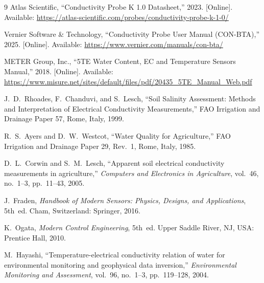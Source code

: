 \documentclass[conference]{IEEEtran}
\begin{document}
\begin{thebibliography}{9}
Atlas Scientific, ``Conductivity Probe K 1.0 Datasheet,'' 2023. [Online]. Available: \url{https://atlas-scientific.com/probes/conductivity-probe-k-1-0/}

{\raggedright
Vernier Software \& Technology, ``Conductivity Probe User Manual (CON-BTA),'' 2025. [Online]. Available: \url{https://www.vernier.com/manuals/con-bta/}\par}

METER Group, Inc., ``5TE Water Content, EC and Temperature Sensors Manual,'' 2018. [Online]. Available: \url{https://www.misure.net/sites/default/files/pdf/20435_5TE_Manual_Web.pdf}

J.~D.~Rhoades, F.~Chanduvi, and S.~Lesch, ``Soil Salinity Assessment: Methods and Interpretation of Electrical Conductivity Measurements,'' FAO Irrigation and Drainage Paper 57, Rome, Italy, 1999.

R.~S.~Ayers and D.~W.~Westcot, ``Water Quality for Agriculture,'' FAO Irrigation and Drainage Paper 29, Rev.\ 1, Rome, Italy, 1985.

D.~L.~Corwin and S.~M.~Lesch, ``Apparent soil electrical conductivity measurements in agriculture,'' \emph{Computers and Electronics in Agriculture}, vol.~46, no.~1--3, pp.~11--43, 2005.

J.~Fraden, \emph{Handbook of Modern Sensors: Physics, Designs, and Applications}, 5th~ed.\hspace{0.5em} Cham, Switzerland: Springer, 2016.

K.~Ogata, \emph{Modern Control Engineering}, 5th~ed.\hspace{0.5em} Upper Saddle River, NJ, USA: Prentice Hall, 2010.

M.~Hayashi, ``Temperature-electrical conductivity relation of water for environmental monitoring and geophysical data inversion,'' \emph{Environmental Monitoring and Assessment}, vol.~96, no.~1--3, pp.~119--128, 2004.

\end{thebibliography}
\end{document}
